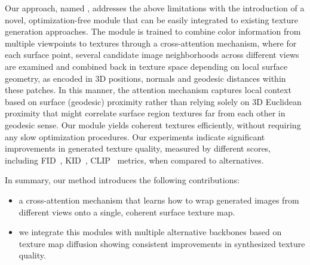 Our approach, named \method, addresses the above limitations with the introduction of a novel, optimization-free module 
that can be easily integrated to existing texture generation approaches. The module is trained to combine color 
information from multiple  viewpoints to textures through a cross-attention mechanism, where for each surface 
point, several candidate image neighborhoods across different views are examined and combined back in texture 
space depending on local surface geometry, 
as encoded in 3D positions, normals and geodesic distances within these patches. 
In this manner, the attention mechanism captures local context based 
on surface (geodesic) proximity rather than relying solely on 3D Euclidean proximity that might correlate surface region textures far from each other 
in geodesic sense. Our module yields coherent textures efficiently, without requiring any slow optimization procedures. Our experiments indicate significant improvements in generated texture quality, measured by different scores, including 
FID~\cite{Heusel:2017:GANs}, KID~\cite{Bińkowski:2018d:Demystifying}, CLIP~\cite{Schuhmann:2022:Laion5b}
metrics, when compared to alternatives. 

In summary, our method introduces the following contributions:
\begin{itemize}
    \item a cross-attention mechanism that learns how to wrap generated images from different views onto a single, coherent surface texture map.
    \item we integrate this modules with multiple alternative backbones based on 
	texture map diffusion showing consistent improvements in synthesized texture quality.
\end{itemize}
